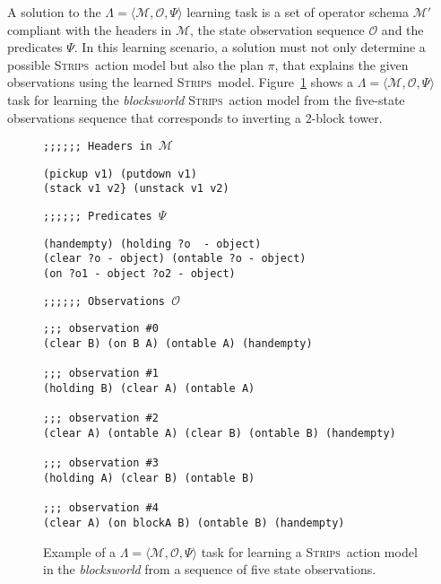 \documentclass[3p,times]{elsarticle}
\newcommand{\strips}{\textsc{Strips}}     %
\newcommand{\tup}[1]{{\langle #1 \rangle}}
\begin{document}
A solution to the $\Lambda=\tup{\mathcal{M},\mathcal{O},\Psi}$ learning task is a set of operator schema $\mathcal{M}'$ compliant with the headers in $\mathcal{M}$, the state observation sequence $\mathcal{O}$ and the predicates $\Psi$. In this learning scenario, a solution must not only determine a possible \strips\ action model but also the plan $\pi$, that explains the given observations using the learned \strips\ model. Figure~\ref{fig:example-observations} shows a $\Lambda=\tup{\mathcal{M},\mathcal{O},\Psi}$ task for learning the {\em blocksworld} \strips\ action model from the five-state observations sequence that corresponds to inverting a 2-block tower.

\begin{figure}[hbt!]
{\footnotesize\tt ;;;;;; Headers in $\mathcal{M}$}
\begin{footnotesize}
\begin{verbatim}
(pickup v1) (putdown v1)
(stack v1 v2} (unstack v1 v2)
\end{verbatim}
\end{footnotesize}
\vspace{0.2cm}
{\footnotesize\tt ;;;;;; Predicates $\Psi$}
\begin{footnotesize}
\begin{verbatim}
(handempty) (holding ?o  - object)
(clear ?o - object) (ontable ?o - object)
(on ?o1 - object ?o2 - object)
\end{verbatim}
\end{footnotesize}
\vspace{0.2cm}
{\footnotesize\tt ;;;;;; Observations $\mathcal{O}$}
\begin{footnotesize}
\begin{verbatim}
;;; observation #0
(clear B) (on B A) (ontable A) (handempty)

;;; observation #1
(holding B) (clear A) (ontable A)

;;; observation #2
(clear A) (ontable A) (clear B) (ontable B) (handempty)

;;; observation #3
(holding A) (clear B) (ontable B)

;;; observation #4
(clear A) (on blockA B) (ontable B) (handempty)
\end{verbatim}
\end{footnotesize}
 \caption{\small Example of a $\Lambda=\tup{\mathcal{M},\mathcal{O},\Psi}$ task for learning a \strips\ action model in the {\em blocksworld} from a sequence of five state observations.}
\label{fig:example-observations}
\end{figure}
\end{document}
